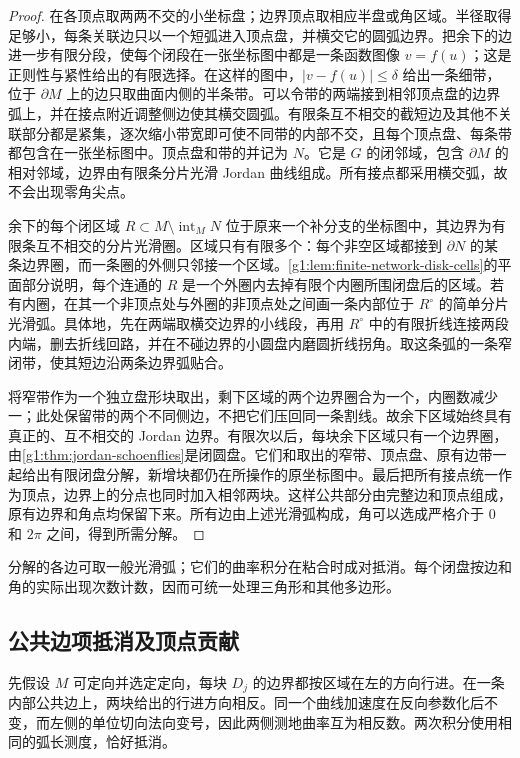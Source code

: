 \begin{proof}
	在各顶点取两两不交的小坐标盘；边界顶点取相应半盘或角区域。半径取得足够小，每条关联边只以一个短弧进入顶点盘，并横交它的圆弧边界。把余下的边进一步有限分段，使每个闭段在一张坐标图中都是一条函数图像 \(v=f(u)\)；这是正则性与紧性给出的有限选择。在这样的图中，\(|v-f(u)|\le\delta\) 给出一条细带，位于 \(\partial M\) 上的边只取曲面内侧的半条带。可以令带的两端接到相邻顶点盘的边界弧上，并在接点附近调整侧边使其横交圆弧。有限条互不相交的截短边及其他不关联部分都是紧集，逐次缩小带宽即可使不同带的内部不交，且每个顶点盘、每条带都包含在一张坐标图中。顶点盘和带的并记为 \(N\)。它是 \(G\) 的闭邻域，包含 \(\partial M\) 的相对邻域，边界由有限条分片光滑 Jordan 曲线组成。所有接点都采用横交弧，故不会出现零角尖点。

	余下的每个闭区域 \(R\subset M\setminus\operatorname{int}_M N\) 位于原来一个补分支的坐标图中，其边界为有限条互不相交的分片光滑圈。区域只有有限多个：每个非空区域都接到 \(\partial N\) 的某条边界圈，而一条圈的外侧只邻接一个区域。\cref{g1:lem:finite-network-disk-cells}的平面部分说明，每个连通的 \(R\) 是一个外圈内去掉有限个内圈所围闭盘后的区域。若有内圈，在其一个非顶点处与外圈的非顶点处之间画一条内部位于 \(R^\circ\) 的简单分片光滑弧。具体地，先在两端取横交边界的小线段，再用 \(R^\circ\) 中的有限折线连接两段内端，删去折线回路，并在不碰边界的小圆盘内磨圆折线拐角。取这条弧的一条窄闭带，使其短边沿两条边界弧贴合。

	将窄带作为一个独立盘形块取出，剩下区域的两个边界圈合为一个，内圈数减少一；此处保留带的两个不同侧边，不把它们压回同一条割线。故余下区域始终具有真正的、互不相交的 Jordan 边界。有限次以后，每块余下区域只有一个边界圈，由\cref{g1:thm:jordan-schoenflies}是闭圆盘。它们和取出的窄带、顶点盘、原有边带一起给出有限闭盘分解，新增块都仍在所操作的原坐标图中。最后把所有接点统一作为顶点，边界上的分点也同时加入相邻两块。这样公共部分由完整边和顶点组成，原有边界和角点均保留下来。所有边由上述光滑弧构成，角可以选成严格介于 \(0\) 和 \(2\pi\) 之间，得到所需分解。
\end{proof}

分解的各边可取一般光滑弧；它们的曲率积分在粘合时成对抵消。每个闭盘按边和角的实际出现次数计数，因而可统一处理三角形和其他多边形。

\subsection{公共边项抵消及顶点贡献}
\label{g1:subsec:0904:02}

先假设 \(M\) 可定向并选定定向，每块 \(D_j\) 的边界都按区域在左的方向行进。在一条内部公共边上，两块给出的行进方向相反。同一个曲线加速度在反向参数化后不变，而左侧的单位切向法向变号，因此两侧测地曲率互为相反数。两次积分使用相同的弧长测度，恰好抵消。

